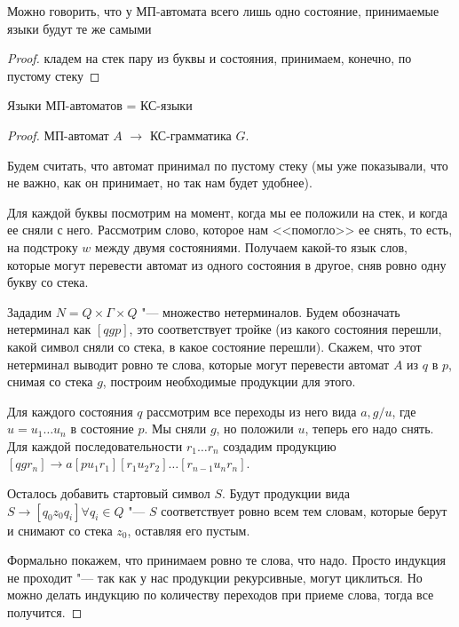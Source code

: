 
\begin{assertion}
Можно говорить, что у МП-автомата всего лишь одно состояние, принимаемые языки будут те же самыми
\end{assertion}
\begin{proof}
кладем на стек пару из буквы и состояния, принимаем, конечно, по пустому стеку
\TODO
\end{proof}

\begin{theorem}
    Языки МП-автоматов = КС-языки
\end{theorem}
\begin{proof}
    МП-автомат $A$ $\to$ КС-грамматика $G$.

    Будем считать, что автомат принимал по пустому стеку (мы уже показывали, что не важно, как он принимает, но так нам будет удобнее).

    Для каждой буквы посмотрим на момент, когда мы ее положили на стек, и когда ее сняли с него. 
    Рассмотрим слово, которое нам <<помогло>> ее снять, то есть, на подстроку $w$ между двумя состояниями.
    Получаем какой-то язык слов, которые могут перевести автомат из одного состояния в другое, сняв ровно одну букву со стека.
    
    Зададим $N = Q \times \Gamma \times Q$ "--- множество нетерминалов. 
    Будем обозначать нетерминал как $[qgp]$, это соответствует тройке (из какого состояния перешли, какой символ сняли со стека, в какое состояние перешли).
    Скажем, что этот нетерминал выводит ровно те слова, которые могут перевести автомат $A$ из $q$ в $p$, снимая со стека $g$, построим необходимые продукции для этого.

    Для каждого состояния $q$ рассмотрим все переходы из него вида $a, g/u$, где $u=u_1\dots u_n$ в состояние $p$.
    Мы сняли $g$, но положили $u$, теперь его надо снять.
    Для каждой последовательности $r_1 \dots r_n$ создадим продукцию $[q g r_n] \to a[p u_1 r_1][r_1 u_2 r_2]\dots [r_{n-1} u_n r_n]$.

    Осталось добавить стартовый символ $S$. 
    Будут продукции вида $S \to [q_0z_0q_i] \forall q_i \in Q$ "--- $S$ соответствует ровно всем тем словам, которые берут и снимают со стека $z_0$, оставляя его пустым.

    Формально покажем, что принимаем ровно те слова, что надо. Просто индукция не проходит "--- так как у нас продукции рекурсивные, могут циклиться.
    Но можно делать индукцию по количеству переходов при приеме слова, тогда все получится. %


\end{proof}
